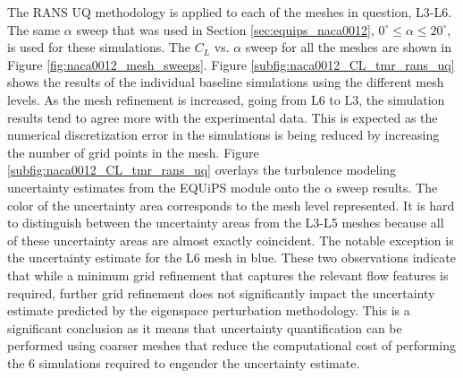The RANS UQ methodology is applied to each of the meshes in question, L3-L6.
The same $\alpha$ sweep that was used in Section \ref{sec:equips_naca0012}, $0^\circ \leq \alpha \leq 20^\circ$, is used for these simulations. 
The $C_L$ vs. $\alpha$ sweep for all the meshes are shown in Figure \ref{fig:naca0012_mesh_sweeps}. 
Figure \ref{subfig:naca0012_CL_tmr_rans_uq} shows the results of the individual baseline simulations using the different mesh levels. 
As the mesh refinement is increased, going from L6 to L3, the simulation results tend to agree more with the experimental data. 
This is expected as the numerical discretization error in the simulations is being reduced by increasing the number of grid points in the mesh. 
Figure \ref{subfig:naca0012_CL_tmr_rans_uq} overlays the turbulence modeling uncertainty estimates from the EQUiPS module onto the $\alpha$ sweep results.
The color of the uncertainty area corresponds to the mesh level represented.
It is hard to distinguish between the uncertainty areas from the L3-L5 meshes because all of these uncertainty areas are almost exactly coincident.
The notable exception is the uncertainty estimate for the L6 mesh in blue. 
These two observations indicate that while a minimum grid refinement that captures the relevant flow features is required, further grid refinement does not significantly impact the uncertainty estimate predicted by the eigenspace perturbation methodology.
This is a significant conclusion as it means that uncertainty quantification can be performed using coarser meshes that reduce the computational cost of performing the 6 simulations required to engender the uncertainty estimate. 

